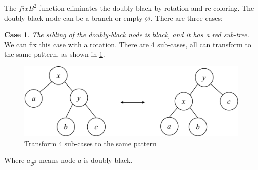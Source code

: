 \documentclass[b5paper]{article}
\begin{document}
The $fixB^2$ function eliminates the doubly-black by rotation and re-coloring. The doubly-black node can be a branch or empty $\pmb{\varnothing}$. There are three cases:

\textbf{Case 1}. {\em The sibling of the doubly-black node is black, and it has a red sub-tree.} We can fix this case with a rotation. There are 4 sub-cases, all can transform to the same pattern, as shown in \cref{fig:del-case1}.

\begin{figure}[htbp]
  \centering
  \includegraphics[scale=0.4, page=3]{img/rbtree}
  \caption{Transform 4 sub-cases to the same pattern}
  \label{fig:del-case1}
\end{figure}

\be
{}
\label{eq:db-case-1}
\ee

Where $a_{\mathcal{B}^2}$ means node $a$ is doubly-black.
\end{document}
